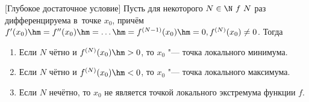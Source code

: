 [Глубокое достаточное условие]\label{glub} Пусть для некоторого $N\in\N\ f\ N$ раз дифференцируема в~точке $x_0$, причём
$f'(x_0)\hm=f''(x_0)\hm=\ldots\hm=f^{(N-1)}(x_0)\hm=0,f^{(N)}(x_0)\neq0$. Тогда

\begin{enumerate}
    \item Если $N$ чётно и $f^{(N)}(x_0)\hm>0$, то $x_0$ "--- точка локального минимума.
    \item Если $N$ чётно и $f^{(N)}(x_0)\hm<0$, то $x_0$ "--- точка локального максимума.
    \item Если $N$ нечётно, то $x_0$ не является точкой локального экстремума функции $f$.
\end{enumerate}
